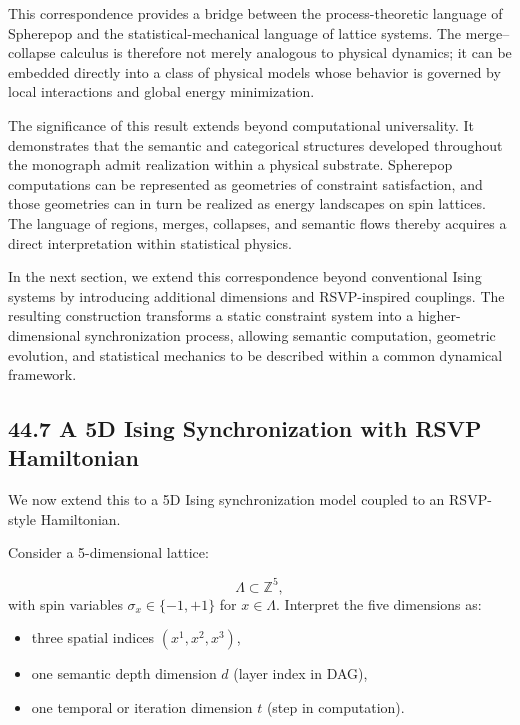 \documentclass[12pt,letterpaper]{article}
\theoremstyle{remark}
\begin{document}
This correspondence provides a bridge between the process-theoretic language of Spherepop and the statistical-mechanical language of lattice systems. The merge--collapse calculus is therefore not merely analogous to physical dynamics; it can be embedded directly into a class of physical models whose behavior is governed by local interactions and global energy minimization.

The significance of this result extends beyond computational universality. It demonstrates that the semantic and categorical structures developed throughout the monograph admit realization within a physical substrate. Spherepop computations can be represented as geometries of constraint satisfaction, and those geometries can in turn be realized as energy landscapes on spin lattices. The language of regions, merges, collapses, and semantic flows thereby acquires a direct interpretation within statistical physics.

In the next section, we extend this correspondence beyond conventional Ising systems by introducing additional dimensions and RSVP-inspired couplings. The resulting construction transforms a static constraint system into a higher-dimensional synchronization process, allowing semantic computation, geometric evolution, and statistical mechanics to be described within a common dynamical framework.

\subsection{44.7 A 5D Ising Synchronization with RSVP Hamiltonian}

We now extend this to a 5D Ising synchronization model coupled to an RSVP-style Hamiltonian.

Consider a 5-dimensional lattice:

\[
\Lambda \subset \mathbb{Z}^5,
\]
with spin variables $\sigma_x \in \{-1,+1\}$ for $x \in \Lambda$. Interpret the five dimensions as:

\begin{itemize}
  \item three spatial indices $(x^1, x^2, x^3)$,
  \item one semantic depth dimension $d$ (layer index in DAG),
  \item one temporal or iteration dimension $t$ (step in computation).
\end{itemize}
\end{document}
